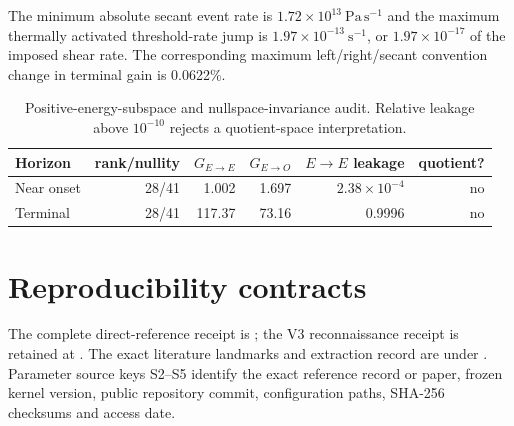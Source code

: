 \documentclass[preprint,12pt]{elsarticle}
\begin{document}
The minimum absolute secant event rate is
$1.72\times10^{13}~\mathrm{Pa\,s^{-1}}$ and the maximum thermally activated
threshold-rate jump is $1.97\times10^{-13}~\mathrm{s^{-1}}$, or
$1.97\times10^{-17}$ of the imposed shear rate.  The corresponding maximum
left/right/secant convention change in terminal gain is 0.0622\%.

\begin{table}[ht]
\centering
\caption{Positive-energy-subspace and nullspace-invariance audit.  Relative
leakage above $10^{-10}$ rejects a quotient-space interpretation.}
\begin{tabular}{@{}lrrrrr@{}}
\toprule
Horizon & rank/nullity & $G_{E\rightarrow E}$ & $G_{E\rightarrow O}$ & $E\rightarrow E$ leakage & quotient? \\
\midrule
Near onset & 28/41 & 1.002 & 1.697 & $2.38\times10^{-4}$ & no \\
Terminal & 28/41 & 117.37 & 73.16 & 0.9996 & no \\
\bottomrule
\end{tabular}
\end{table}

\section{Reproducibility contracts}

The complete direct-reference receipt is
; the V3 reconnaissance
receipt is retained at .  The exact literature
landmarks and extraction record are under
.  Parameter
source keys S2--S5 identify the exact reference record or paper, frozen kernel
version, public repository commit, configuration paths, SHA-256 checksums and
access date.
\end{document}
